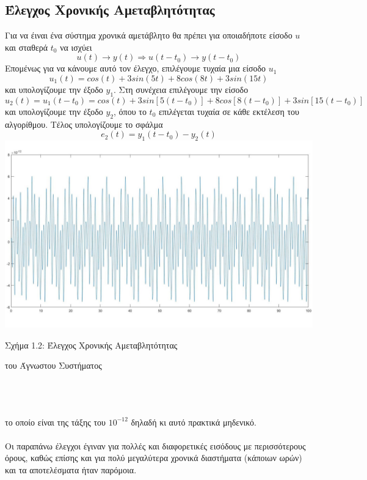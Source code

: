 \documentclass[12pt]{article}
\begin{document}
\subsection{Έλεγχος Χρονικής Αμεταβλητότητας}
Για να έιναι ένα σύστημα χρονικά αμετάβλητο θα πρέπει για οποιαδήποτε είσοδο $u$ και σταθερά $t_0$ να ισχύει
\[u(t) \rightarrow y(t) \Rightarrow u(t-t_0) \rightarrow y(t-t_0)\]
Επομένως για να κάνουμε αυτό τον έλεγχο, επιλέγουμε τυχαία μια είσοδο $u_1$
\[ u_1(t)=cos(t)+3sin(5t)+8cos(8t)+3sin(15t)\]
και υπολογίζουμε την έξοδο $y_1$. Στη συνέχεια επιλέγουμε την είσοδο
\[ u_2(t)=u_1(t-t_0)=cos(t)+3sin[5(t-t_0)]+8cos[8(t-t_0)]+3sin[15(t-t_0)] \]
και υπολογίζουμε την έξοδο $y_2$, όπου το $t_0$ επιλέγεται τυχαία σε κάθε εκτέλεση του αλγορίθμου. Τέλος υπολογίζουμε το σφάλμα
\[e_{2}(t)=y_1(t-t_0)-y_2(t) \]
\includegraphics[width=\linewidth]{time_inv.jpg}
\centerline{Σχήμα 1.2: Έλεγχος Χρονικής Αμεταβλητότητας}
\centerline{του Άγνωστου Συστήματος}
\\ \\ \\
το οποίο είναι της τάξης του $10^{-12}$ δηλαδή κι αυτό πρακτικά μηδενικό. 
\\ \\
Οι παραπάνω έλεγχοι έγιναν για πολλές και διαφορετικές εισόδους με περισσότερους όρους, καθώς επίσης και για πολύ μεγαλύτερα χρονικά διαστήματα (κάποιων ωρών) και τα αποτελέσματα ήταν παρόμοια.
\end{document}
